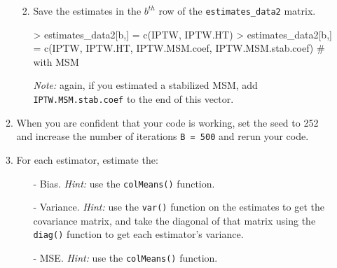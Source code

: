 \documentclass{exam}
\begin{document}
\begin{enumerate}
\begin{enumerate}
\begin{enumerate}
\begin{enumerate}
\end{enumerate}
\item Save the estimates in the $b^{th}$ row of the \texttt{estimates\_data2} matrix.
\begin{Schunk}
\begin{Sinput}
> estimates_data2[b,] = c(IPTW, IPTW.HT)
> estimates_data2[b,] = c(IPTW, IPTW.HT, IPTW.MSM.coef, IPTW.MSM.stab.coef) # with MSM
\end{Sinput}
\end{Schunk}
\textit{Note:} again, if you estimated a stabilized MSM, add \texttt{IPTW.MSM.stab.coef} to the end of this vector.
\end{enumerate}
\item When you are confident that your code is working, set the seed to 252 and increase the number of iterations \texttt{B = 500} and rerun your code. 
\item For each estimator, estimate the:
\begin{itemize}
\item[-] Bias. \textit{Hint:} use the \texttt{colMeans()} function.
\item[-] Variance. \textit{Hint:} use the \texttt{var()} function on the estimates to get the covariance matrix, and take the diagonal of that matrix using the \texttt{diag()} function to get each estimator's variance.
\item[-] MSE. \textit{Hint:} use the \texttt{colMeans()} function.
\end{itemize}
\end{enumerate}
\end{enumerate}
\end{document}
